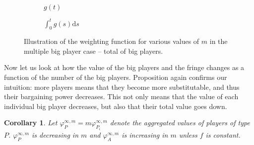\documentclass[a4paper]{article}
\newtheorem{corollary}{Corollary}
\newcommand{\ds}{\mathrm{d}s}
\begin{document}
\begin{figure}[ht]
    \centering
    \begin{subfigure}[b]{0.45\textwidth}
        \centering
        \caption{$g(t)$}
    \end{subfigure}
    \begin{subfigure}[b]{0.45\textwidth}
        \centering
        \caption{$\int_0^t g(s) \ds$}
    \end{subfigure}
    \caption{Illustration of the weighting function for various values of $m$ in the multiple big player case -- total of big players.}
    \label{fig:multiple_platforms_total}
\end{figure}

Now let us look at how the value of the big players and the fringe changes as a function of the number of the big players.
Proposition  again confirms our intuition: more players means that they become more substitutable, and thus their bargaining power decreases.
This not only means that the value of each individual big player decreases, but also that their total value goes down.

\begin{corollary}
    \label{cor:multiple_platforms_2}
    Let $\varphi_{P}^{\infty, m} = m\varphi_{P_i}^{\infty, m}$ denote the aggregated values of players of type $P$. $\varphi_{P}^{\infty, m}$ is decreasing in $m$ and $\varphi_{A}^{\infty, m}$ is increasing in $m$ unless $f$ is constant.
\end{corollary}
\end{document}
